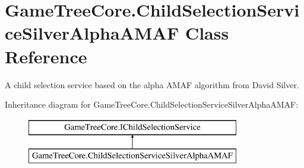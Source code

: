 \hypertarget{class_game_tree_core_1_1_child_selection_service_silver_alpha_a_m_a_f}{}\section{Game\+Tree\+Core.\+Child\+Selection\+Service\+Silver\+Alpha\+A\+M\+AF Class Reference}
\label{class_game_tree_core_1_1_child_selection_service_silver_alpha_a_m_a_f}


A child selection service based on the alpha A\+M\+AF algorithm from David Silver.  


Inheritance diagram for Game\+Tree\+Core.\+Child\+Selection\+Service\+Silver\+Alpha\+A\+M\+AF\+:\begin{figure}[H]
\begin{center}
\leavevmode
\includegraphics[height=2.000000cm]{class_game_tree_core_1_1_child_selection_service_silver_alpha_a_m_a_f}
\end{center}
\end{figure}
